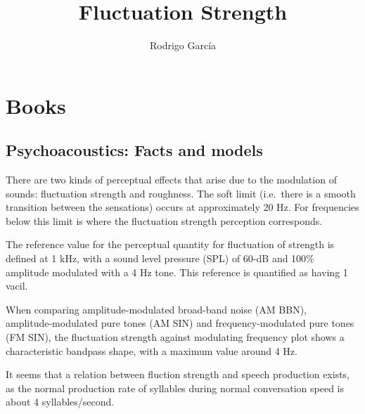 \documentclass[a4paper,10pt,draft]{article}
\begin{document}
\title{Fluctuation Strength}
\author{Rodrigo García}
\maketitle

\section{Books}

\subsection{Psychoacoustics: Facts and models}

There are two kinds of perceptual effects that arise due to the modulation of
sounds: fluctuation strength and roughness. The soft limit (i.e.\ there is a
smooth transition between the sensations) occurs at approximately 20 Hz. For
frequencies below this limit is where the fluctuation strength perception
corresponds.

The reference value for the perceptual quantity for fluctuation of strength is
defined at 1 kHz, with a sound level pressure (SPL) of 60-dB and 100\% amplitude
modulated with a 4 Hz tone. This reference is quantified as having 1 vacil.

When comparing amplitude-modulated broad-band noise (AM BBN), \\
amplitude-modulated pure tones (AM SIN) and frequency-modulated pure tones
(FM SIN), the fluctuation strength against modulating frequency plot shows a
characteristic bandpass shape, with a maximum value around 4 Hz.

It seems that a relation between fluction strength and speech production exists,
as the normal production rate of syllables during normal conversation speed is
about 4 syllables/second.
\end{document}
